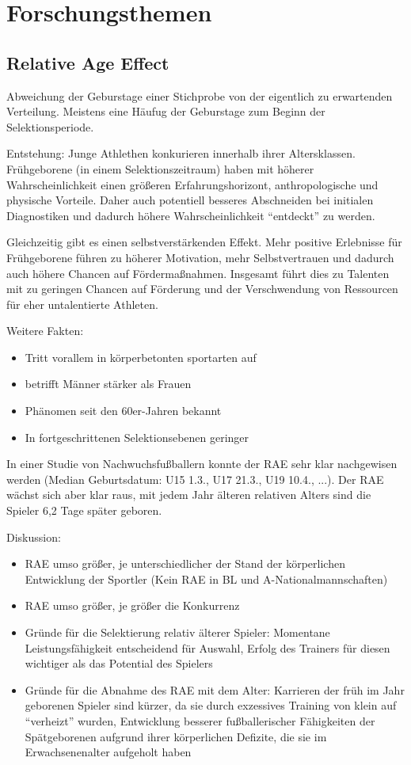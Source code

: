 
\section{Forschungsthemen}

\subsection{Relative Age Effect}

Abweichung der Geburstage einer Stichprobe von der eigentlich zu erwartenden Verteilung. Meistens eine Häufug der Geburstage zum Beginn der Selektionsperiode.

Entstehung: Junge Athlethen konkurieren innerhalb ihrer Altersklassen. Frühgeborene (in einem Selektionszeitraum) haben mit höherer Wahrscheinlichkeit einen größeren Erfahrungshorizont, anthropologische und physische Vorteile. Daher auch potentiell besseres Abschneiden bei initialen Diagnostiken und dadurch höhere Wahrscheinlichkeit ``entdeckt'' zu werden.

Gleichzeitig gibt es einen selbstverstärkenden Effekt. Mehr positive Erlebnisse für Frühgeborene führen zu höherer Motivation, mehr Selbstvertrauen und dadurch auch höhere Chancen auf Fördermaßnahmen.
Insgesamt führt dies zu Talenten mit zu geringen Chancen auf Förderung und der Verschwendung von Ressourcen für eher untalentierte Athleten.

Weitere Fakten:
\begin{itemize}
    \item Tritt vorallem in körperbetonten sportarten auf
    \item betrifft Männer stärker als Frauen
    \item Phänomen seit den 60er-Jahren bekannt
    \item In fortgeschrittenen Selektionsebenen geringer
\end{itemize}

In einer Studie von Nachwuchsfußballern konnte der RAE sehr klar nachgewisen werden (Median Geburtsdatum: U15 1.3., U17 21.3., U19 10.4., ...). Der RAE wächst sich aber klar raus, mit jedem Jahr älteren relativen Alters sind die Spieler 6,2 Tage später geboren.

Diskussion:
\begin{itemize}
    \item RAE umso größer, je unterschiedlicher der Stand der körperlichen Entwicklung der Sportler (Kein RAE in BL und A-Nationalmannschaften)
    \item RAE umso größer, je größer die Konkurrenz
    \item Gründe für die Selektierung relativ älterer Spieler: Momentane Leistungsfähigkeit entscheidend für Auswahl, Erfolg des Trainers für diesen wichtiger als das Potential des Spielers
    \item Gründe für die Abnahme des RAE mit dem Alter: Karrieren der früh im Jahr geborenen Spieler sind kürzer, da sie durch exzessives Training von klein auf “verheizt” wurden, Entwicklung besserer fußballerischer Fähigkeiten der Spätgeborenen aufgrund ihrer körperlichen Defizite, die sie im Erwachsenenalter aufgeholt haben
\end{itemize}

